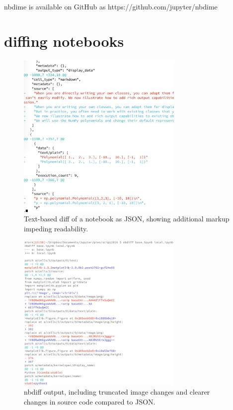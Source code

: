 \documentclass{../../Proposal/Latex-Proposal/deliverablereport}
\begin{document}
nbdime is available on GitHub as https://github.com/jupyter/nbdime

\section{diffing notebooks} %
\label{sec:diffing_notebooks}

\begin{figure}
    \center
    \includegraphics[width=8cm]{img/json-diff}
    \caption{Text-based diff of a notebook as JSON, showing additional markup impeding readability.}
    \label{fig:json-diff}
\end{figure}

\begin{figure}
    \center
    \includegraphics[width=8cm]{img/nbdiff}
    \caption{nbdiff output, including truncated image changes and clearer changes in source code compared to JSON.}
    \label{fig:nbdiff}
\end{figure}
\end{document}
